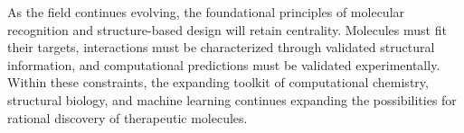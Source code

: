 \documentclass[12pt,a4paper]{article}
\begin{document}
As the field continues evolving, the foundational principles of molecular recognition and structure-based design will retain centrality. Molecules must fit their targets, interactions must be characterized through validated structural information, and computational predictions must be validated experimentally. Within these constraints, the expanding toolkit of computational chemistry, structural biology, and machine learning continues expanding the possibilities for rational discovery of therapeutic molecules.



\end{document}
